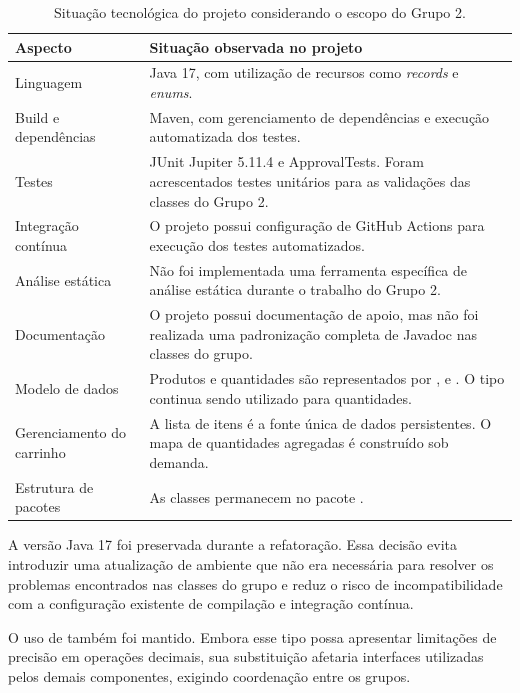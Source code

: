 \begin{table}[H]\centering\small
\begin{tabularx}{\textwidth}{>{\raggedright\arraybackslash}p{3.6cm}Y}
\toprule
\textbf{Aspecto} & \textbf{Situação observada no projeto} \\
\midrule
Linguagem & Java 17, com utilização de recursos como \textit{records} e \textit{enums}. \\
\addlinespace
Build e dependências & Maven, com gerenciamento de dependências e execução automatizada dos testes. \\
\addlinespace
Testes & JUnit Jupiter 5.11.4 e ApprovalTests. Foram acrescentados testes unitários para as validações das classes do Grupo 2. \\
\addlinespace
Integração contínua & O projeto possui configuração de GitHub Actions para execução dos testes automatizados. \\
\addlinespace
Análise estática & Não foi implementada uma ferramenta específica de análise estática durante o trabalho do Grupo 2. \\
\addlinespace
Documentação & O projeto possui documentação de apoio, mas não foi realizada uma padronização completa de Javadoc nas classes do grupo. \\
\addlinespace
Modelo de dados & Produtos e quantidades são representados por ,  e . O tipo  continua sendo utilizado para quantidades. \\
\addlinespace
Gerenciamento do carrinho & A lista de itens é a fonte única de dados persistentes. O mapa de quantidades agregadas é construído sob demanda. \\
\addlinespace
Estrutura de pacotes & As classes permanecem no pacote . \\
\bottomrule
\end{tabularx}
\caption{Situação tecnológica do projeto considerando o escopo do Grupo 2.}
\end{table}

A versão Java 17 foi preservada durante a refatoração. Essa decisão evita introduzir uma atualização de ambiente que não era necessária para resolver os problemas encontrados nas classes do grupo e reduz o risco de incompatibilidade com a configuração existente de compilação e integração contínua.

O uso de  também foi mantido. Embora esse tipo possa apresentar limitações de precisão em operações decimais, sua substituição afetaria interfaces utilizadas pelos demais componentes, exigindo coordenação entre os grupos.

